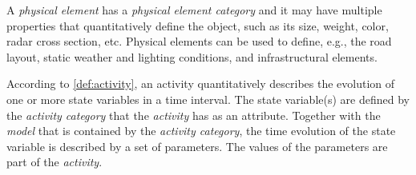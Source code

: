 \cstartb A \textit{physical element} has a \textit{physical element category} and it may have multiple properties that quantitatively define the object, such as its \cendb size, weight, color, radar cross section, etc.  \cendb Physical elements can be used to define, e.g., the road layout, static weather and lighting conditions, and infrastructural elements.

According to \cref{def:activity}, an activity quantitatively describes the evolution of one or more state variables in a time interval. The state variable(s) are defined by the \textit{activity category} that the \textit{activity} has as an attribute. Together with the \textit{model} that is contained by the \textit{activity category}, the time evolution of the state variable is described by a set of parameters. The values of the parameters are part of the \textit{activity}. 



